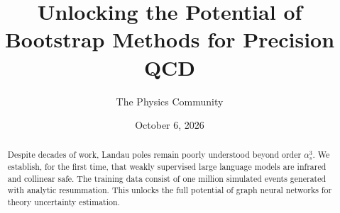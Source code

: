 \documentclass[11pt]{article}
\title{Unlocking the Potential of Bootstrap Methods for Precision QCD}
\author{The Physics Community}
\date{October 6, 2026}
\numberwithin{equation}{section}
\theoremstyle{definition}
\theoremstyle{remark}
\begin{document}
\maketitle
\begin{abstract}
Despite decades of work, Landau poles remain poorly understood beyond
order $\alpha_s^3$. We establish, for the first time, that weakly
supervised large language models are infrared and collinear safe. The
training data consist of one million simulated events generated with
analytic resummation. This unlocks the full potential of graph neural
networks for theory uncertainty estimation.
\end{abstract}
\tableofcontents




\nocite{*}


\end{document}
